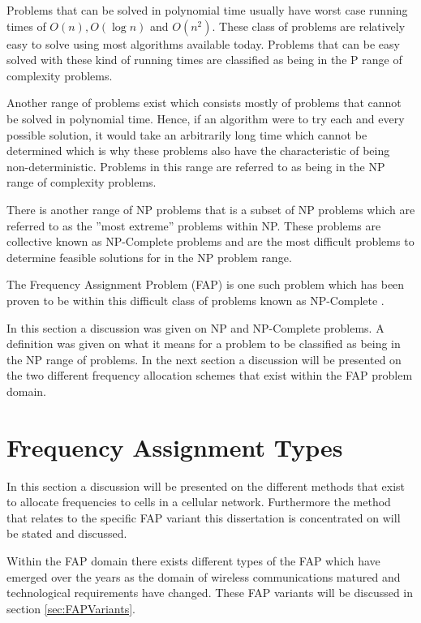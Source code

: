 Problems that can be solved in polynomial time usually have worst case running times of $O(n),O(\log n)$ and $O(n^2)$. These class of problems are relatively easy to solve using most algorithms available today. Problems that can be easy solved with these kind of running times are classified as being in the P range of complexity problems\cite{AIModernApproach}.

Another range of problems exist which consists mostly of problems that cannot be solved in polynomial time. Hence, if an algorithm were to try each and every possible solution, it would take an arbitrarily long time which cannot be determined which is why these problems also have the characteristic of being non-deterministic. Problems in this range are referred to as being in the NP range of complexity problems\cite{AIModernApproach}.

There is another range of NP problems that is a subset of NP problems which are referred to as the ''most extreme'' problems within NP.  These problems are collective known as NP-Complete problems and are the most difficult problems to determine feasible solutions for in the NP problem range\cite{AIModernApproach}.

The Frequency Assignment Problem (FAP) is one such problem which has been proven to be within this difficult class of problems known as NP-Complete \cite{MontemanniThesis,Eisenblatter,Karen2004,AndreasPaper,FixedFAPPSO}.

In this section a discussion was given on NP and NP-Complete problems. A definition was given on what it means for a problem to be classified as being in the NP range of problems. In the next section a discussion will be presented on the two different frequency allocation schemes that exist within the FAP problem domain.
\section{Frequency Assignment Types}
\label{sec:FreqAssignmentTypes}
In this section a discussion will be presented on the different methods that exist to allocate frequencies to cells in a cellular network. Furthermore the method that relates to the specific FAP variant this dissertation is concentrated on will be stated and discussed.

Within the FAP domain there exists different types of the FAP which have emerged over the years as the domain of wireless communications matured and technological requirements have changed. These FAP variants will be discussed in section \ref{sec:FAPVariants}.

